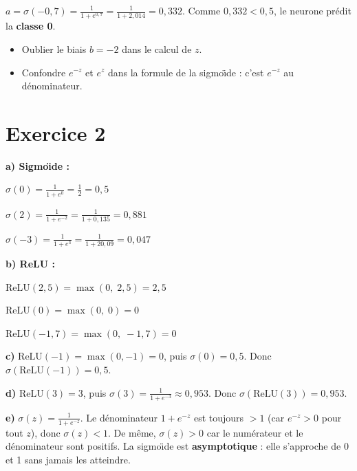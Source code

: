 $a = \sigma(-0{,}7) = \frac{1}{1 + e^{0{,}7}} = \frac{1}{1 + 2{,}014} = \boxed{0{,}332}$.
Comme $0{,}332 < 0{,}5$, le neurone pr\'{e}dit la \textbf{classe 0}.

\begin{attentionbox}
\begin{itemize}
    \item Oublier le biais $b = -2$ dans le calcul de $z$.
    \item Confondre $e^{-z}$ et $e^{z}$ dans la formule de la sigmo\"{\i}de : c'est $e^{-z}$ au d\'{e}nominateur.
\end{itemize}
\end{attentionbox}

\section*{Exercice 2 \hfill \exofondamental}

\separateur

\textbf{a) Sigmo\"{\i}de :}

$\sigma(0) = \frac{1}{1+e^0} = \frac{1}{2} = \boxed{0{,}5}$

$\sigma(2) = \frac{1}{1+e^{-2}} = \frac{1}{1+0{,}135} = \boxed{0{,}881}$

$\sigma(-3) = \frac{1}{1+e^{3}} = \frac{1}{1+20{,}09} = \boxed{0{,}047}$

\textbf{b) ReLU :}

$\text{ReLU}(2{,}5) = \max(0,\; 2{,}5) = \boxed{2{,}5}$

$\text{ReLU}(0) = \max(0,\; 0) = \boxed{0}$

$\text{ReLU}(-1{,}7) = \max(0,\; -1{,}7) = \boxed{0}$

\textbf{c)} $\text{ReLU}(-1) = \max(0, -1) = 0$, puis $\sigma(0) = 0{,}5$.
Donc $\sigma(\text{ReLU}(-1)) = \boxed{0{,}5}$.

\textbf{d)} $\text{ReLU}(3) = 3$, puis $\sigma(3) = \frac{1}{1+e^{-3}} \approx 0{,}953$.
Donc $\sigma(\text{ReLU}(3)) = \boxed{0{,}953}$.

\textbf{e)} $\sigma(z) = \frac{1}{1+e^{-z}}$. Le d\'{e}nominateur $1 + e^{-z}$ est toujours $> 1$
(car $e^{-z} > 0$ pour tout $z$), donc $\sigma(z) < 1$.
De m\^{e}me, $\sigma(z) > 0$ car le num\'{e}rateur et le d\'{e}nominateur sont positifs.
La sigmo\"{\i}de est \textbf{asymptotique} : elle s'approche de 0 et 1 sans jamais les atteindre.

